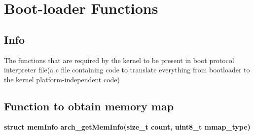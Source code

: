 \documentclass{report}
\begin{document}
\section{Boot-loader Functions}
\subsection*{Info}
The functions that are required by the kernel to be present in boot protocol interpreter file(a c file containing code to translate everything from bootloader to the kernel platform-independent code)


\subsection*{Function to obtain memory map}
\textbf{struct memInfo arch\_getMemInfo(size\_t count, uint8\_t mmap\_type)}
\end{document}
